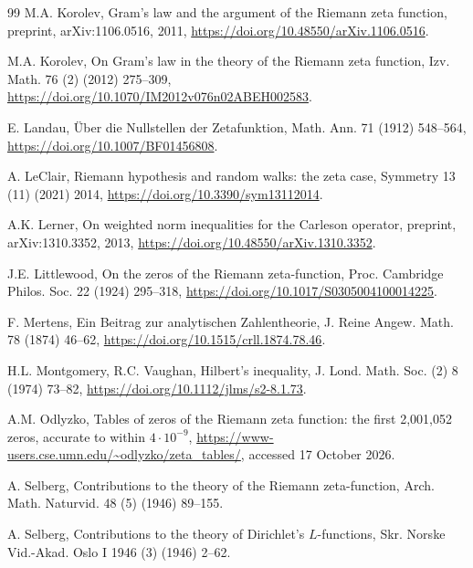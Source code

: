 \documentclass[preprint,12pt]{elsarticle}
\numberwithin{equation}{section}
\theoremstyle{plain}
\theoremstyle{definition}
\theoremstyle{remark}
\begin{document}
\begin{thebibliography}{99}
M.A. Korolev, Gram's law and the argument of the Riemann zeta function, preprint, arXiv:1106.0516, 2011, \href{https://doi.org/10.48550/arXiv.1106.0516}{https://doi.org/10.48550/arXiv.1106.0516}.

M.A. Korolev, On Gram's law in the theory of the Riemann zeta function, Izv. Math. 76 (2) (2012) 275--309, \href{https://doi.org/10.1070/IM2012v076n02ABEH002583}{https://doi.org/10.1070/IM2012v076n02ABEH002583}.

E. Landau, \"Uber die Nullstellen der Zetafunktion, Math. Ann. 71 (1912) 548--564, \href{https://doi.org/10.1007/BF01456808}{https://doi.org/10.1007/BF01456808}.

A. LeClair, Riemann hypothesis and random walks: the zeta case, Symmetry 13 (11) (2021) 2014, \href{https://doi.org/10.3390/sym13112014}{https://doi.org/10.3390/sym13112014}.

A.K. Lerner, On weighted norm inequalities for the Carleson operator, preprint, arXiv:1310.3352, 2013, \href{https://doi.org/10.48550/arXiv.1310.3352}{https://doi.org/10.48550/arXiv.1310.3352}.

J.E. Littlewood, On the zeros of the Riemann zeta-function, Proc. Cambridge Philos. Soc. 22 (1924) 295--318, \href{https://doi.org/10.1017/S0305004100014225}{https://doi.org/10.1017/S0305004100014225}.

F. Mertens, Ein Beitrag zur analytischen Zahlentheorie, J. Reine Angew. Math. 78 (1874) 46--62, \href{https://doi.org/10.1515/crll.1874.78.46}{https://doi.org/10.1515/crll.1874.78.46}.

H.L. Montgomery, R.C. Vaughan, Hilbert's inequality, J. Lond. Math. Soc. (2) 8 (1974) 73--82, \href{https://doi.org/10.1112/jlms/s2-8.1.73}{https://doi.org/10.1112/jlms/s2-8.1.73}.

A.M. Odlyzko, Tables of zeros of the Riemann zeta function: the first 2,001,052 zeros, accurate to within $4\cdot10^{-9}$, \url{https://www-users.cse.umn.edu/~odlyzko/zeta_tables/}, accessed 17 October 2026.

A. Selberg, Contributions to the theory of the Riemann zeta-function, Arch. Math. Naturvid. 48 (5) (1946) 89--155.

A. Selberg, Contributions to the theory of Dirichlet's $L$-functions, Skr. Norske Vid.-Akad. Oslo I 1946 (3) (1946) 2--62.


\end{thebibliography}
\end{document}
